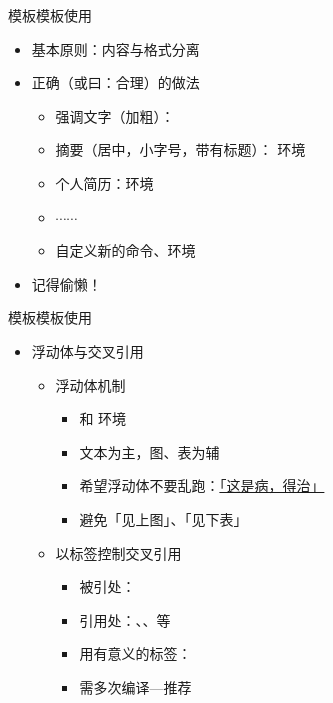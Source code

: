 \documentclass[xcolor=svgnames, t, aspectratio=169]{ctexbeamer}
\begin{document}
\begin{frame}[t]{\nwafuthesis 模板}{模板使用}
  \stretchon
  \begin{itemize}
  \item 基本原则：\alert{内容与格式分离}
  \item 正确（或曰：合理）的做法

    \begin{itemize}
      \item 强调文字（加粗）：
      \item 摘要（居中，小字号，带有标题）： 环境
      \item 个人简历：环境
      \item $\cdots\cdots$  
      \item 自定义新的命令、环境
    \end{itemize}

  \item 记得\alert{偷懒！}
    
  \end{itemize}
  \stretchoff
\end{frame}

\begin{frame}{\nwafuthesis 模板}{模板使用}
  \stretchon
  \begin{itemize}
  \item 浮动体与交叉引用
    \begin{itemize}
    \item 浮动体机制

      \begin{itemize}
      \item {} 和  环境
      \item 文本为主，图、表为辅
      \item 希望浮动体不要乱跑：\href{https://liam.page/2017/03/11/floats-in-LaTeX-basic}{「这是病，得治」}
      \item 避免「见上图」、「见下表」
      \end{itemize}

    \item 以标签控制交叉引用

      \begin{itemize}
      \item 被引处：\texinline{\label}
      \item 引用处：\alert{\texinline{\autoref}}、\texinline{\ref}、\texinline{\eqref}等
      \item 用有意义的标签：\texinline{\label{eq:euler-lagrange-eq}}
      \item 需多次编译---推荐 
      \end{itemize}
    \end{itemize}
  \end{itemize}
  \stretchoff
\end{frame}
\end{document}

